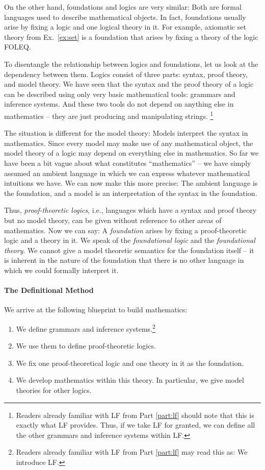 On the other hand, foundations and logics are very similar: Both are formal languages used to describe mathematical objects. In fact, foundations usually arise by fixing a logic and one logical theory in it. For example, axiomatic set theory from Ex.~\ref{ex:set} is a foundation that arises by fixing a theory of the logic FOLEQ.
\medskip

To disentangle the relationship between logics and foundations, let us look at the dependency between them. Logics consist of three parts: syntax, proof theory, and model theory.
We have seen that the syntax and the proof theory of a logic can be described using only very basic mathematical tools: grammars and inference systems. And these two tools do not depend on anything else in mathematics -- they are just producing and manipulating strings.
\footnote{Readers already familiar with LF from Part \ref{part:lf} should note that this is exactly what LF provides. Thus, if we take LF for granted, we can define all the other grammars and inference systems within LF.}

The situation is different for the model theory: Models interpret the syntax in mathematics. Since every model may make use of any mathematical object, the model theory of a logic may depend on everything else in mathematics. So far we have been a bit vague about what constitutes ``mathematics'' -- we have simply assumed an ambient language in which we can express whatever mathematical intuitions we have. We can now make this more precise: The ambient language is the foundation, and a model is an interpretation of the syntax in the foundation.
\medskip

Thus, \emph{proof-theoretic logics}, i.e., languages which have a syntax and proof theory but no model theory, can be given without reference to other areas of mathematics.
Now we can say: A \emph{foundation} arises by fixing a proof-theoretic logic and a theory in it. We speak of the \emph{foundational logic} and the \emph{foundational theory}.
We cannot give a model theoretic semantics for the foundation itself -- it is inherent in the nature of the foundation that there is no other language in which we could formally interpret it.

\paragraph{The Definitional Method}
We arrive at the following blueprint to build mathematics:
\begin{enumerate}
 \item We define grammars and inference systems.\footnote{Readers already familiar with LF from Part \ref{part:lf} may read this as: We introduce LF.}
 \item We use them to define proof-theoretic logics.
 \item We fix one proof-theoretical logic and one theory in it as the foundation.
 \item We develop mathematics within this theory. In particular, we give model theories for other logics.
\end{enumerate}

